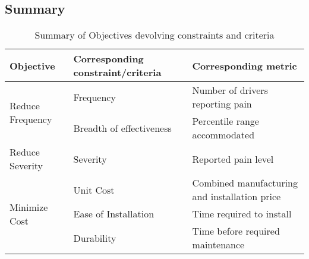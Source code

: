 \documentclass[11pt]{article}
\begin{document}
\subsection{Summary}

\begin{table}[h!]
\centering
\caption{Summary of Objectives devolving constraints and criteria}
\begin{tabular}{l l p{5cm}}
Objective & Corresponding constraint/criteria & Corresponding metric \\ \hline
\multirow{2}{*}{Reduce Frequency} & Frequency & Number of drivers reporting pain \\
& Breadth of effectiveness & Percentile range accommodated \\
Reduce Severity & Severity & Reported pain level \\
\multirow{3}{*}{Minimize Cost} & Unit Cost & Combined manufacturing and installation price \\
& Ease of Installation & Time required to install \\
& Durability & Time before required maintenance \\
\end{tabular}
\end{table}


\end{document}

